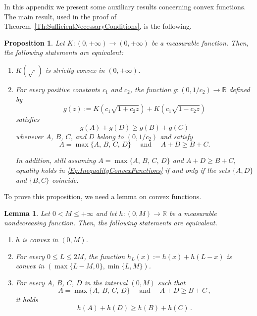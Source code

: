 \documentclass[12pt,reqno]{amsart}
\newtheorem{proposition}[theorem]{Proposition}
\newtheorem{lemma}[theorem]{Lemma}
\theoremstyle{definition}
\theoremstyle{remark}
\newcommand{\con}[1]{\mathbb{#1}}
\newcommand{\R}{\con{R}} %
\numberwithin{equation}{section}
\begin{document}
In this appendix we present some auxiliary results concerning convex functions. The main result, used in the proof of Theorem~\ref{Th:SufficientNecessaryConditions}, is the following.

\begin{proposition}
	\label{Prop:EquivalenceK(sqrt)Convex<->Inequality}
	Let $K:(0, +\infty) \to (0,+\infty)$ be a measurable function. Then, the following statements are equivalent:
	\begin{enumerate}
		\item[i)] $K(\sqrt{\cdot})$ is strictly convex in $(0, +\infty)$.
		\item[ii)] For every positive constants $c_1$ and $c_2$, the function $g:(0,1/c_2)\to \R$ defined by
		\begin{equation}
		\label{Eq:DefinitiongFromK}
		g(z) := K(c_1 \sqrt{1 + c_2z}) + K(c_1 \sqrt{1 - c_2z})
		\end{equation}
		satisfies 
		\begin{equation}
		\label{Eq:InequalityConvexFunctions}
		g(A) + g(D) \geq g(B) + g(C)
		\end{equation}
		whenever $A$, $B$, $C$, and $D$ belong to $(0, 1/c_2)$ and satisfy
		$$
		A = \max\{A,\, B,\, C,\, D\} \quad \text{ and } \quad A + D \geq B + C.
		$$
		
		In addition, still assuming $A = \max\{A,\, B,\, C,\, D\}$ and $A + D \geq B + C$, equality holds in \eqref{Eq:InequalityConvexFunctions} if and only if the sets $\{A,D\}$ and $\{B,C\}$ coincide.	
	\end{enumerate}
\end{proposition}



To prove this proposition, we need a lemma on convex functions. 


\begin{lemma}
	\label{Lemma:ConvexFunctions}
	Let $0<M\leq +\infty$ and let $h:(0,M)\to \R$ be a measurable nondecreasing function. Then, the following statements are equivalent.
	
	\begin{enumerate}[label=(\alph*)]
		\item $h$ is convex in $(0,M)$.
		
		\item For every $0\leq L\leq 2M$, the function $h_L (x) := h(x) + h(L-x)$ is convex in $(\max \{L-M,0\}, \min \{L,M\})$.
		
		\item For every $A$, $B$, $C$, $D$ in the interval $(0,M)$ such that
		$$
		A = \max\{A,\, B,\, C,\, D\} \quad \text{ and } \quad A + D \geq B + C\,,
		$$
		it holds
		\begin{equation}
		\label{Eq:InequalityConvexFunctionsbis}
		h(A) + h(D) \geq h(B) + h(C)\,.
		\end{equation}
	\end{enumerate}
\end{lemma}
\end{document}
